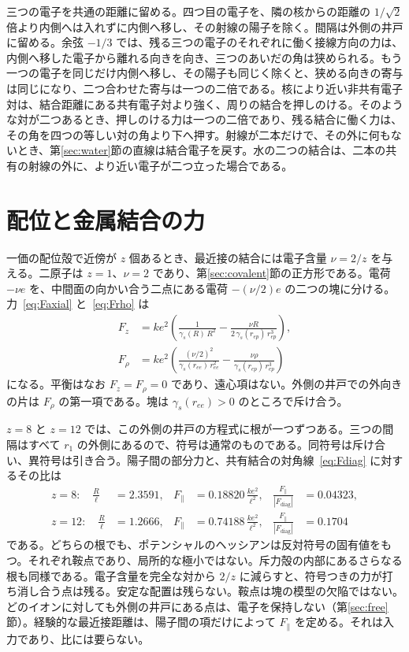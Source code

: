 \documentclass[a4paper]{article}
\begin{document}
三つの電子を共通の距離に留める。四つ目の電子を、隣の核からの距離の \(1/\sqrt{2}\) 倍より内側へは入れずに内側へ移し、その射線の陽子を除く。間隔は外側の井戸に留める。余弦 \(-1/3\) では、残る三つの電子のそれぞれに働く接線方向の力は、内側へ移した電子から離れる向きを向き、三つのあいだの角は狭められる。もう一つの電子を同じだけ内側へ移し、その陽子も同じく除くと、狭める向きの寄与は同じになり、二つ合わせた寄与は一つの二倍である。核により近い非共有電子対は、結合距離にある共有電子対より強く、周りの結合を押しのける。そのような対が二つあるとき、押しのける力は一つの二倍であり、残る結合に働く力は、その角を四つの等しい対の角より下へ押す。射線が二本だけで、その外に何もないとき、第\ref{sec:water}節の直線は結合電子を戻す。水の二つの結合は、二本の共有の射線の外に、より近い電子が二つ立った場合である。

\section{配位と金属結合の力}
\label{sec:metal}

一価の配位殻で近傍が \(z\) 個あるとき、最近接の結合には電子含量 \(\nu=2/z\) を与える。二原子は \(z=1\)、\(\nu=2\) であり、第\ref{sec:covalent}節の正方形である。電荷 \(-\nu e\) を、中間面の向かい合う二点にある電荷 \(-(\nu/2)e\) の二つの塊に分ける。力~\eqref{eq:Faxial} と~\eqref{eq:Frho} は
\begin{align}
F_z
  &=k e^{2}\left(
    \frac{1}{\gamma_s(R)\,R^{2}}
    -\frac{\nu R}{2\,\gamma_s(r_{ep})\,r_{ep}^{3}}
  \right),
\label{eq:Fznu}\\
F_{\rho}
  &=k e^{2}\left(
    \frac{(\nu/2)^{2}}{\gamma_s(r_{ee})\,r_{ee}^{2}}
    -\frac{\nu\rho}{\gamma_s(r_{ep})\,r_{ep}^{3}}
  \right)
\end{align}
になる。平衡はなお \(F_z=F_{\rho}=0\) であり、遠心項はない。外側の井戸での外向きの片は \(F_{\rho}\) の第一項である。塊は \(\gamma_s(r_{ee})>0\) のところで斥け合う。

\(z=8\) と \(z=12\) では、この外側の井戸の方程式に根が一つずつある。三つの間隔はすべて \(r_1\) の外側にあるので、符号は通常のものである。同符号は斥け合い、異符号は引き合う。陽子間の部分力と、共有結合の対角線~\eqref{eq:Fdiag} に対するその比は
\begin{align}
z=8:\quad
\frac{R}{\ell}&=2.3591,&
F_{\parallel}&=0.18820\,\frac{k e^{2}}{\ell^{2}},&
\frac{F_{\parallel}}{|F_{\mathrm{diag}}|}&=0.04323,
\label{eq:ratio8}\\
z=12:\quad
\frac{R}{\ell}&=1.2666,&
F_{\parallel}&=0.74188\,\frac{k e^{2}}{\ell^{2}},&
\frac{F_{\parallel}}{|F_{\mathrm{diag}}|}&=0.1704
\label{eq:ratio12}
\end{align}
である。どちらの根でも、ポテンシャルのヘッシアンは反対符号の固有値をもつ。それぞれ鞍点であり、局所的な極小ではない。斥力殻の内部にあるさらなる根も同様である。電子含量を完全な対から \(2/z\) に減らすと、符号つきの力が打ち消し合う点は残る。安定な配置は残らない。鞍点は塊の模型の欠陥ではない。どのイオンに対しても外側の井戸にある点は、電子を保持しない（第\ref{sec:free}節）。経験的な最近接距離は、陽子間の項だけによって \(F_{\parallel}\) を定める。それは入力であり、比には要らない。
\end{document}
